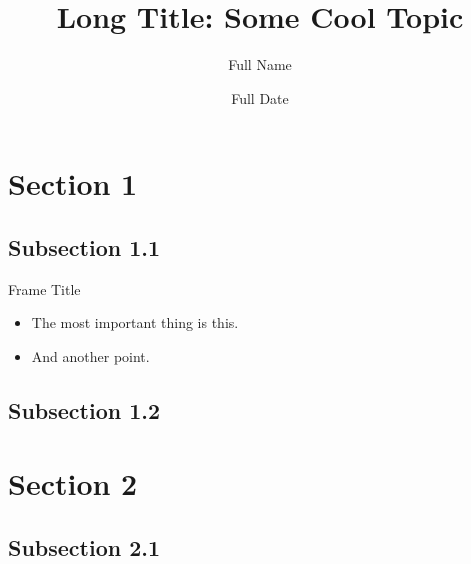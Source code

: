 \documentclass[xcolor=dvipsnames]{beamer}
\title[Short Title]{Long Title: Some Cool Topic}
\author[Short Name]{Full Name}
\institute[Short Org]{Full Organization Name}
\date[Short Date]{Full Date}
\begin{document}
\begin{frame}
   \titlepage
\end{frame}

\section{Section 1}
\subsection{Subsection 1.1}
\begin{frame}
   {Frame Title}
   \begin{itemize}
      \item The most important thing is \alert{this}.
      \item And another point.
   \end{itemize}
\end{frame}

\subsection{Subsection 1.2}

\section{Section 2}
\subsection{Subsection 2.1}
\end{document}
